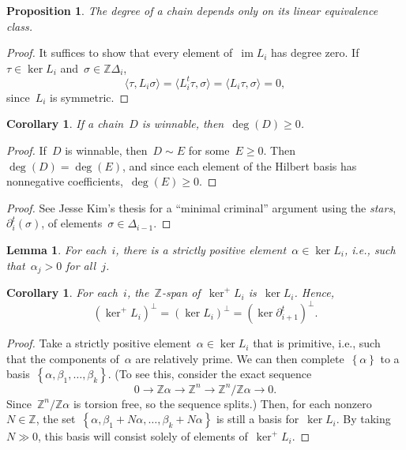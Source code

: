 \documentclass[12pt]{article}
\newcommand{\Z}{\mathbb{Z}}
\DeclareMathOperator{\im}{\mathrm{im}}
\newtheorem{lemma}[theorem]{Lemma}
\newtheorem{cor}[theorem]{Corollary}
\newtheorem{prop}[theorem]{Proposition}
\theoremstyle{definition}
\theoremstyle{remark}
\begin{document}
\begin{prop} The degree of a chain depends only on its linear equivalence
  class. 
\end{prop}
\begin{proof} It suffices to show that every element of~$\im L_i$ has degree
  zero.  If~$\tau\in\ker L_i$ and~$\sigma\in\Z\Delta_i$, 
  \[
    \langle \tau,L_i\sigma\rangle
    =\langle L_i^t\tau,\sigma\rangle
    =\langle L_i\tau,\sigma\rangle
    =0,
  \]
  since~$L_i$ is symmetric.
\end{proof}
\begin{cor}
  If a chain~$D$ is winnable, then~$\deg(D)\geq0$.
\end{cor}
\begin{proof}  If~$D$ is winnable, then~$D\sim E$ for some~$E\geq0$.
  Then~$\deg(D)=\deg(E)$, and since
  each element of the Hilbert basis has nonnegative
  coefficients,~$\deg(E)\geq0$.
\end{proof}
\begin{proof}
  See Jesse Kim's thesis for a ``minimal criminal'' argument using the
  {\em stars},~$\partial_i^t(\sigma)$, of elements~$\sigma\in\Delta_{i-1}$.
\end{proof}
\begin{lemma}  For each~$i$, there is a strictly positive element~$\alpha\in\ker
  L_i$, i.e., such that~$\alpha_j>0$ for all~$j$. 
\end{lemma}
\begin{cor} For each~$i$, the~$\Z$-span of~$\ker^{+}L_i$ is~$\ker L_i$.
Hence, 
\[
  (\ker^{+}L_i)^{\perp}=(\ker L_i)^{\perp}=(\ker\partial_{i+1}^t)^{\perp}.
  \]
\end{cor}
\begin{proof}
  Take a strictly positive element~$\alpha\in\ker L_i$ that is primitive, i.e., such
  that the components of~$\alpha$ are relatively prime.  We can then
  complete~$\left\{ \alpha \right\}$ to a basis~$\left\{ \alpha, \beta_1,\dots,\beta_k\right\}$.
  (To see this, consider the exact sequence
  \[
    0\to \Z\alpha\to\Z^n\to\Z^n/\Z\alpha\to0.
  \]
Since~$\Z^n/\Z\alpha$ is torsion free, so the sequence splits.) Then, for
each nonzero~$N\in\Z$, the set~$\left\{ \alpha,
\beta_1+N\alpha,\dots,\beta_k+N\alpha\right\}$ is still a basis for~$\ker L_i$.
By taking~$N\gg 0$, this basis will consist solely of elements
of~$\ker^{+}L_i$.
\end{proof}
\end{document}
